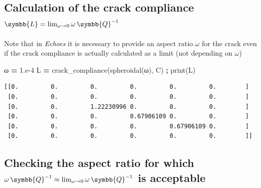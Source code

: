 \documentclass[
  a4paper,
  numbers=noendperiod,
  DIV=12]{scrreprt}
\newenvironment{Shaded}{\begin{snugshade}}{\end{snugshade}}
\newcommand{\BuiltInTok}[1]{#1}
\newcommand{\FloatTok}[1]{\textcolor[rgb]{0.00,0.00,0.81}{#1}}
\newcommand{\NormalTok}[1]{#1}
\newcommand{\OperatorTok}[1]{\textcolor[rgb]{0.81,0.36,0.00}{\textbf{#1}}}
\newcommand{\uuuu}[1]{{\symbb{{#1}}}}
\begin{document}
\subsection{\texorpdfstring{Calculation of the crack compliance
\(\uuuu{L}=\lim_{\omega\to 0}\omega\,\uuuu{Q}^{-1}\)}{Calculation of the crack compliance \textbackslash uuuu\{L\}=\textbackslash lim\_\{\textbackslash omega\textbackslash to 0\}\textbackslash omega\textbackslash,\textbackslash uuuu\{Q\}\^{}\{-1\}}}\label{calculation-of-the-crack-compliance-uuuullim_omegato-0omegauuuuq-1}

Note that in \emph{Echoes} it is necessary to provide an aspect ratio
\(\omega\) for the crack even if the crack compliance is actually
calculated as a limit (not depending on \(\omega\))

\begin{Shaded}
\begin{Highlighting}[]
\NormalTok{ω }\OperatorTok{=} \FloatTok{1.e{-}4}
\NormalTok{L }\OperatorTok{=}\NormalTok{ crack\_compliance(spheroidal(ω), C) }\OperatorTok{;} \BuiltInTok{print}\NormalTok{(L)}
\end{Highlighting}
\end{Shaded}

\begin{verbatim}
[[0.         0.         0.         0.         0.         0.        ]
 [0.         0.         0.         0.         0.         0.        ]
 [0.         0.         1.22230996 0.         0.         0.        ]
 [0.         0.         0.         0.67906109 0.         0.        ]
 [0.         0.         0.         0.         0.67906109 0.        ]
 [0.         0.         0.         0.         0.         0.        ]]
\end{verbatim}

\subsection{\texorpdfstring{Checking the aspect ratio for which
\(\omega\,\uuuu{Q}^{-1}\approx \lim_{\omega\to 0}\omega\,\uuuu{Q}^{-1}\)
is
acceptable}{Checking the aspect ratio for which \textbackslash omega\textbackslash,\textbackslash uuuu\{Q\}\^{}\{-1\}\textbackslash approx \textbackslash lim\_\{\textbackslash omega\textbackslash to 0\}\textbackslash omega\textbackslash,\textbackslash uuuu\{Q\}\^{}\{-1\} is acceptable}}\label{checking-the-aspect-ratio-for-which-omegauuuuq-1approx-lim_omegato-0omegauuuuq-1-is-acceptable}
\end{document}
